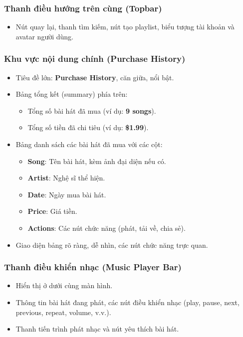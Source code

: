 \documentclass{book}
\begin{document}
\subsubsection{Thanh điều hướng trên cùng (Topbar)}
\begin{itemize}
    \item Nút quay lại, thanh tìm kiếm, nút tạo playlist, biểu tượng tài khoản và avatar người dùng.
\end{itemize}

\subsubsection{Khu vực nội dung chính (Purchase History)}
\begin{itemize}
    \item Tiêu đề lớn: \textbf{Purchase History}, căn giữa, nổi bật.
    \item Bảng tổng kết (summary) phía trên:
    \begin{itemize}
        \item Tổng số bài hát đã mua (ví dụ: \textbf{9 songs}).
        \item Tổng số tiền đã chi tiêu (ví dụ: \textbf{\$1.99}).
    \end{itemize}
    \item Bảng danh sách các bài hát đã mua với các cột:
    \begin{itemize}
        \item \textbf{Song}: Tên bài hát, kèm ảnh đại diện nếu có.
        \item \textbf{Artist}: Nghệ sĩ thể hiện.
        \item \textbf{Date}: Ngày mua bài hát.
        \item \textbf{Price}: Giá tiền.
        \item \textbf{Actions}: Các nút chức năng (phát, tải về, chia sẻ).
    \end{itemize}
    \item Giao diện bảng rõ ràng, dễ nhìn, các nút chức năng trực quan.
\end{itemize}

\subsubsection{Thanh điều khiển nhạc (Music Player Bar)}
\begin{itemize}
    \item Hiển thị ở dưới cùng màn hình.
    \item Thông tin bài hát đang phát, các nút điều khiển nhạc (play, pause, next, previous, repeat, volume, v.v.).
    \item Thanh tiến trình phát nhạc và nút yêu thích bài hát.
\end{itemize}
\end{document}
